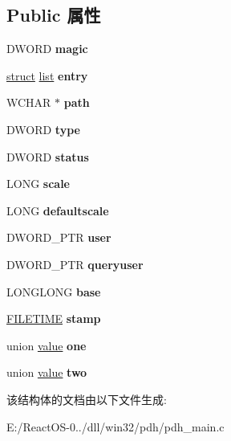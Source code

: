 \subsection*{Public 属性}
\begin{DoxyCompactItemize}
\item 
\mbox{\label{structcounter_a165a4a05e0aced78a96c0c308b13c1d7}} 
D\+W\+O\+RD {\bfseries magic}
\item 
\mbox{\label{structcounter_a364970c02bb0ce99fad62cf941f157c8}} 
\hyperlink{interfacestruct}{struct} \hyperlink{classlist}{list} {\bfseries entry}
\item 
\mbox{\label{structcounter_ac7db76d6e49cf972efb06de5b0b9af80}} 
W\+C\+H\+AR $\ast$ {\bfseries path}
\item 
\mbox{\label{structcounter_a13e770373f676c15d714f2d6fe56cb4a}} 
D\+W\+O\+RD {\bfseries type}
\item 
\mbox{\label{structcounter_a17d816ccb4cc642ddb92682fcf81a6da}} 
D\+W\+O\+RD {\bfseries status}
\item 
\mbox{\label{structcounter_ab68688355042d4d20ee96701a78ec05d}} 
L\+O\+NG {\bfseries scale}
\item 
\mbox{\label{structcounter_a85b23ff95ec822b68e3d4715a08bdde8}} 
L\+O\+NG {\bfseries defaultscale}
\item 
\mbox{\label{structcounter_a4f5b7774541533c95abba0e39cfd4625}} 
D\+W\+O\+R\+D\+\_\+\+P\+TR {\bfseries user}
\item 
\mbox{\label{structcounter_a8bffc8a5272c2b8ee650e080619a08f2}} 
D\+W\+O\+R\+D\+\_\+\+P\+TR {\bfseries queryuser}
\item 
\mbox{\label{structcounter_a9e10b267c7768bca2cdd5af8ff33dcff}} 
L\+O\+N\+G\+L\+O\+NG {\bfseries base}
\item 
\mbox{\label{structcounter_a983fc4dfdb1c93a1fdf944da4d6ddc36}} 
\hyperlink{struct___f_i_l_e_t_i_m_e}{F\+I\+L\+E\+T\+I\+ME} {\bfseries stamp}
\item 
\mbox{\label{structcounter_a8752fbddf64c002073af06dbc73c7242}} 
union \hyperlink{unionvalue}{value} {\bfseries one}
\item 
\mbox{\label{structcounter_a62d0465a53c80ba92493085a42817356}} 
union \hyperlink{unionvalue}{value} {\bfseries two}
\end{DoxyCompactItemize}


该结构体的文档由以下文件生成\+:\begin{DoxyCompactItemize}
\item 
E\+:/\+React\+O\+S-\/0../dll/win32/pdh/pdh\+\_\+main.\+c\end{DoxyCompactItemize}
